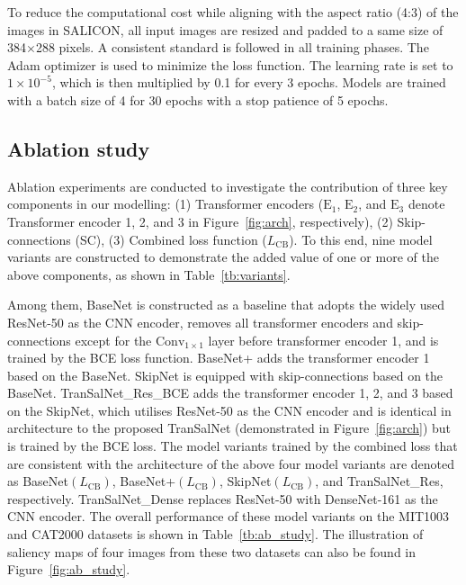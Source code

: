 \documentclass{article}
\begin{document}
To reduce the computational cost while aligning with the aspect ratio (4:3) of the images in SALICON, all input images are resized and padded to a same size of 384$\times$288 pixels. 
A consistent standard is followed in all training phases. The Adam optimizer \cite{adam} is used to minimize the loss function. 
The learning rate is set to 
$1 \times 10^{-5}$, 
which is then multiplied by 0.1 for every 3 epochs.
Models are trained with a batch size of 4 for 30 epochs with a stop patience of 5 epochs.


\subsection{Ablation study}


Ablation experiments are conducted to investigate the contribution of three key components in our modelling:
(1) Transformer encoders ($\text{E}_1$, $\text{E}_2$, and $\text{E}_3$ denote Transformer encoder 1, 2, and 3 in Figure~\ref{fig:arch}, respectively),
(2) Skip-connections (SC), 
(3) Combined loss function ($L_{\text{CB}}$). To this end, nine model variants are constructed to demonstrate the added value of one or more of the above components, as shown in Table~\ref{tb:variants}.

Among them, BaseNet is constructed as a baseline that adopts the widely used ResNet-50 as the CNN encoder, removes all transformer encoders and skip-connections except for the $\text{Conv}_{1\times1}$ layer before transformer encoder 1, and is trained by the BCE loss function. 
BaseNet+ adds the transformer encoder 1 based on the BaseNet.
SkipNet is equipped with skip-connections based on the BaseNet.
TranSalNet\_Res\_BCE adds the transformer encoder 1, 2, and 3 based on the SkipNet, which utilises ResNet-50 as the CNN encoder and is
identical in architecture to the proposed TranSalNet (demonstrated in Figure~\ref{fig:arch}) but is trained by the BCE loss.
The model variants trained by the combined loss that are consistent with the architecture of the above four model variants are denoted as BaseNet$(L_{\text{CB}})$, BaseNet+$(L_{\text{CB}})$, SkipNet$(L_{\text{CB}})$, and TranSalNet\_Res, respectively.
TranSalNet\_Dense replaces ResNet-50 with DenseNet-161 as the CNN encoder.
The overall performance of these model variants on the MIT1003 and CAT2000 datasets is shown in Table~\ref{tb:ab_study}. 
The illustration of saliency maps of four images from these two datasets can also be found in Figure~\ref{fig:ab_study}.
\end{document}

